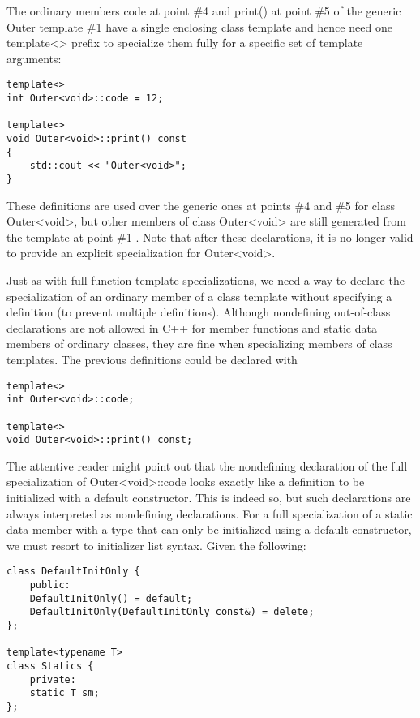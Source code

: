 The ordinary members code at point \#4 and print() at point \#5 of the generic Outer template \#1 have a single enclosing class template and hence need one template<> prefix to specialize them fully for a specific set of template arguments:

\begin{lstlisting}[style=styleCXX]
template<>
int Outer<void>::code = 12;

template<>
void Outer<void>::print() const
{
	std::cout << "Outer<void>";
}
\end{lstlisting}

These definitions are used over the generic ones at points \#4 and \#5 for class Outer<void>, but other members of class Outer<void> are still generated from the template at point \#1 . Note that after these declarations, it is no longer valid to provide an explicit specialization for Outer<void>.

Just as with full function template specializations, we need a way to declare the specialization of an ordinary member of a class template without specifying a definition (to prevent multiple definitions). Although nondefining out-of-class declarations are not allowed in C++ for member functions and static data members of ordinary classes, they are fine when specializing members of class templates. The previous definitions could be declared with

\begin{lstlisting}[style=styleCXX]
template<>
int Outer<void>::code;

template<>
void Outer<void>::print() const;
\end{lstlisting}

The attentive reader might point out that the nondefining declaration of the full specialization of Outer<void>::code looks exactly like a definition to be initialized with a default constructor. This is indeed so, but such declarations are always interpreted as nondefining declarations. For a full specialization of a static data member with a type that can only be initialized using a default constructor, we must resort to initializer list syntax. Given the following:

\begin{lstlisting}[style=styleCXX]
class DefaultInitOnly {
	public:
	DefaultInitOnly() = default;
	DefaultInitOnly(DefaultInitOnly const&) = delete;
};

template<typename T>
class Statics {
	private:
	static T sm;
};
\end{lstlisting}

